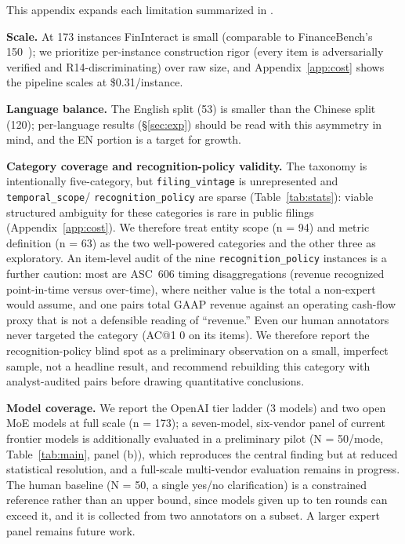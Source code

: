 This appendix expands each limitation summarized in \limref.

\textbf{Scale.} At 173 instances FinInteract is small (comparable to
FinanceBench's 150~\citep{islam2023financebench}); we prioritize per-instance
construction rigor (every item is adversarially verified and R14-discriminating)
over raw size, and Appendix~\ref{app:cost} shows the pipeline scales at
\$0.31/instance.

\textbf{Language balance.} The English split (53) is smaller
than the Chinese split (120); per-language results (\S\ref{sec:exp}) should be
read with this asymmetry in mind, and the EN portion is a target for growth.

\textbf{Category coverage and recognition-policy validity.} The taxonomy is intentionally
five-category, but \texttt{filing\_vintage} is unrepresented and \texttt{temporal\_scope}/%
\texttt{recognition\_policy} are sparse (Table~\ref{tab:stats}): viable
structured ambiguity for these categories is rare in public filings (Appendix~\ref{app:cost}).
We therefore treat entity scope (n = 94) and metric definition (n = 63) as the two
well-powered categories and the other three as exploratory. An item-level audit of the nine
\texttt{recognition\_policy} instances is a further caution: most are ASC~606 timing
disaggregations (revenue recognized point-in-time versus over-time), where neither value is
the total a non-expert would assume, and one pairs total GAAP revenue against an operating
cash-flow proxy that is not a defensible reading of ``revenue.'' Even our human annotators
never targeted the category (AC@1 0 on its items). We therefore report the
recognition-policy blind spot as a preliminary observation on a small, imperfect sample, not
a headline result, and recommend rebuilding this category with analyst-audited pairs before
drawing quantitative conclusions.

\textbf{Model coverage.} We report the OpenAI tier ladder (3 models) and two open
MoE models at full scale (n = 173); a seven-model, six-vendor panel of current
frontier models is additionally evaluated in a preliminary pilot (N = 50/mode,
Table~\ref{tab:main}, panel (b)), which reproduces the central finding but at reduced
statistical resolution, and a full-scale multi-vendor evaluation remains in progress.
The human baseline (N = 50, a single yes/no clarification) is a constrained reference
rather than an upper bound, since models given up to ten rounds can exceed it, and it is
collected from two annotators on a subset. A larger expert panel remains future work.

